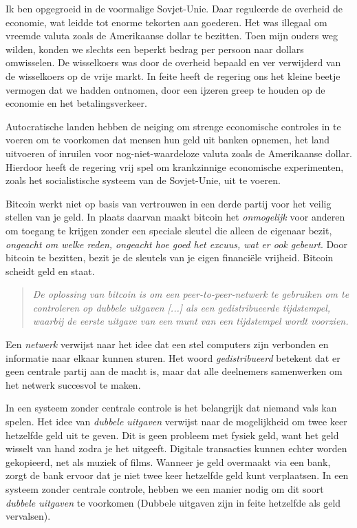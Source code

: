 \documentclass[smalldemyvopaper,11pt,twoside,onecolumn,openright,extrafontsizes]{memoir}
\begin{document}
Ik ben opgegroeid in de voormalige Sovjet-Unie. Daar reguleerde de overheid de economie, wat leidde tot enorme tekorten aan goederen. Het was illegaal om vreemde valuta zoals de Amerikaanse dollar te bezitten. Toen mijn ouders weg wilden, konden we slechts een beperkt bedrag per persoon naar dollars omwisselen. De wisselkoers was door de overheid bepaald en ver verwijderd van de wisselkoers op de vrije markt. In feite heeft de regering ons het kleine beetje vermogen dat we hadden ontnomen, door een ijzeren greep te houden op de economie en het betalingsverkeer.

Autocratische landen hebben de neiging om strenge economische controles in te voeren om te voorkomen dat mensen hun geld uit banken opnemen, het land uitvoeren of inruilen voor nog-niet-waardeloze valuta zoals de Amerikaanse dollar. Hierdoor heeft de regering vrij spel om krankzinnige economische experimenten, zoals het socialistische systeem van de Sovjet-Unie, uit te voeren.

Bitcoin werkt niet op basis van vertrouwen in een derde partij voor het veilig stellen van je geld. In plaats daarvan maakt bitcoin het \textit{onmogelijk} voor anderen om toegang te krijgen zonder een speciale sleutel die alleen de eigenaar bezit, \textit{ongeacht om welke reden, ongeacht hoe goed het excuus, wat er ook gebeurt}. Door bitcoin te bezitten, bezit je de sleutels van je eigen financiële vrijheid. Bitcoin scheidt geld en staat.

\begin{quote}
\textit{De oplossing van bitcoin is om een peer-to-peer-netwerk te gebruiken om te controleren op dubbele uitgaven [...] als een gedistribueerde tijdstempel, waarbij de eerste uitgave van een munt van een tijdstempel wordt voorzien.}
\end{quote}

Een \textit{netwerk} verwijst naar het idee dat een stel computers zijn verbonden en informatie naar elkaar kunnen sturen. Het woord \textit{gedistribueerd} betekent dat er geen centrale partij aan de macht is, maar dat alle deelnemers samenwerken om het netwerk succesvol te maken.

In een systeem zonder centrale controle is het belangrijk dat niemand vals kan spelen. Het idee van \textit{dubbele uitgaven} verwijst naar de mogelijkheid om twee keer hetzelfde geld uit te geven. Dit is geen probleem met fysiek geld, want het geld wisselt van hand zodra je het uitgeeft. Digitale transacties kunnen echter worden gekopieerd, net als muziek of films. Wanneer je geld overmaakt via een bank, zorgt de bank ervoor dat je niet twee keer hetzelfde geld kunt verplaatsen. In een systeem zonder centrale controle, hebben we een manier nodig om dit soort \textit{dubbele uitgaven} te voorkomen (Dubbele uitgaven zijn in feite hetzelfde als geld vervalsen). 
\end{document}
